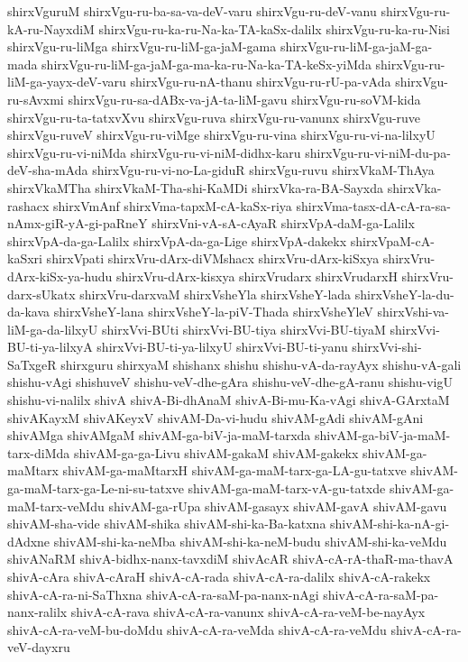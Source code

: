 {shirxVguruM
shirxVgu-ru-ba-sa-va-deV-varu
shirxVgu-ru-deV-vanu
shirxVgu-ru-kA-ru-NayxdiM
shirxVgu-ru-ka-ru-Na-ka-TA-kaSx-dalilx
shirxVgu-ru-ka-ru-Nisi
shirxVgu-ru-liMga
shirxVgu-ru-liM-ga-jaM-gama
shirxVgu-ru-liM-ga-jaM-ga-mada
shirxVgu-ru-liM-ga-jaM-ga-ma-ka-ru-Na-ka-TA-keSx-yiMda
shirxVgu-ru-liM-ga-yayx-deV-varu
shirxVgu-ru-nA-thanu
shirxVgu-ru-rU-pa-vAda
shirxVgu-ru-sAvxmi
shirxVgu-ru-sa-dABx-va-jA-ta-liM-gavu
shirxVgu-ru-soVM-kida
shirxVgu-ru-ta-tatxvXvu
shirxVgu-ruva
shirxVgu-ru-vanunx
shirxVgu-ruve
shirxVgu-ruveV
shirxVgu-ru-viMge
shirxVgu-ru-vina
shirxVgu-ru-vi-na-lilxyU
shirxVgu-ru-vi-niMda
shirxVgu-ru-vi-niM-didhx-karu
shirxVgu-ru-vi-niM-du-pa-deV-sha-mAda
shirxVgu-ru-vi-no-La-giduR
shirxVgu-ruvu
shirxVkaM-ThAya
shirxVkaMTha
shirxVkaM-Tha-shi-KaMDi
shirxVka-ra-BA-Sayxda
shirxVka-rashacx
shirxVmAnf
shirxVma-tapxM-cA-kaSx-riya
shirxVma-tasx-dA-cA-ra-sa-nAmx-giR-yA-gi-paRneY
shirxVni-vA-sA-cAyaR
shirxVpA-daM-ga-Lalilx
shirxVpA-da-ga-Lalilx
shirxVpA-da-ga-Lige
shirxVpA-dakekx
shirxVpaM-cA-kaSxri
shirxVpati
shirxVru-dArx-diVMshacx
shirxVru-dArx-kiSxya
shirxVru-dArx-kiSx-ya-hudu
shirxVru-dArx-kisxya
shirxVrudarx
shirxVrudarxH
shirxVru-darx-sUkatx
shirxVru-darxvaM
shirxVsheYla
shirxVsheY-lada
shirxVsheY-la-du-da-kava
shirxVsheY-lana
shirxVsheY-la-piV-Thada
shirxVsheYleV
shirxVshi-va-liM-ga-da-lilxyU
shirxVvi-BUti
shirxVvi-BU-tiya
shirxVvi-BU-tiyaM
shirxVvi-BU-ti-ya-lilxyA
shirxVvi-BU-ti-ya-lilxyU
shirxVvi-BU-ti-yanu
shirxVvi-shi-SaTxgeR
shirxguru
shirxyaM
shishanx
shishu
shishu-vA-da-rayAyx
shishu-vA-gali
shishu-vAgi
shishuveV
shishu-veV-dhe-gAra
shishu-veV-dhe-gA-ranu
shishu-vigU
shishu-vi-nalilx
shivA
shivA-Bi-dhAnaM
shivA-Bi-mu-Ka-vAgi
shivA-GArxtaM
shivAKayxM
shivAKeyxV
shivAM-Da-vi-hudu
shivAM-gAdi
shivAM-gAni
shivAMga
shivAMgaM
shivAM-ga-biV-ja-maM-tarxda
shivAM-ga-biV-ja-maM-tarx-diMda
shivAM-ga-ga-Livu
shivAM-gakaM
shivAM-gakekx
shivAM-ga-maMtarx
shivAM-ga-maMtarxH
shivAM-ga-maM-tarx-ga-LA-gu-tatxve
shivAM-ga-maM-tarx-ga-Le-ni-su-tatxve
shivAM-ga-maM-tarx-vA-gu-tatxde
shivAM-ga-maM-tarx-veMdu
shivAM-ga-rUpa
shivAM-gasayx
shivAM-gavA
shivAM-gavu
shivAM-sha-vide
shivAM-shika
shivAM-shi-ka-Ba-katxna
shivAM-shi-ka-nA-gi-dAdxne
shivAM-shi-ka-neMba
shivAM-shi-ka-neM-budu
shivAM-shi-ka-veMdu
shivANaRM
shivA-bidhx-nanx-tavxdiM
shivAcAR
shivA-cA-rA-thaR-ma-thavA
shivA-cAra
shivA-cAraH
shivA-cA-rada
shivA-cA-ra-dalilx
shivA-cA-rakekx
shivA-cA-ra-ni-SaThxna
shivA-cA-ra-saM-pa-nanx-nAgi
shivA-cA-ra-saM-pa-nanx-ralilx
shivA-cA-rava
shivA-cA-ra-vanunx
shivA-cA-ra-veM-be-nayAyx
shivA-cA-ra-veM-bu-doMdu
shivA-cA-ra-veMda
shivA-cA-ra-veMdu
shivA-cA-ra-veV-dayxru
}
